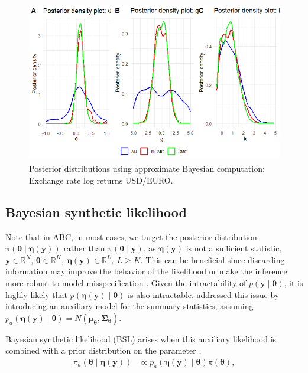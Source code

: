 \begin{figure}[!h]
	\includegraphics[width=340pt, height=200pt]{Chapters/chapter15/figures/ABCexcrate.png}
	\caption[List of figure caption goes here]{Posterior distributions using approximate Bayesian computation: Exchange rate log returns USD/EURO.}\label{figABCexc}
\end{figure}

\subsection{Bayesian synthetic likelihood}\label{sec15_13}

Note that in ABC, in most cases, we target the posterior distribution $\pi(\boldsymbol{\theta} \mid \boldsymbol{\eta}(\boldsymbol{y}))$ rather than $\pi(\boldsymbol{\theta} \mid \boldsymbol{y})$, as $\boldsymbol{\eta}(\boldsymbol{y})$ is not a sufficient statistic, $\boldsymbol{y}\in \mathbb{R}^N$, $\boldsymbol{\theta}\in \mathbb{R}^K, \ \boldsymbol{\eta}(\boldsymbol{y})\in \mathbb{R}^L, \ L\geq K$. This can be beneficial since discarding information may improve the behavior of the likelihood or make the inference more robust to model misspecification \cite{price2018bayesian}. Given the intractability of $p(\boldsymbol{y} \mid \boldsymbol{\theta})$, it is highly likely that $p(\boldsymbol{\eta}(\boldsymbol{y}) \mid \boldsymbol{\theta})$ is also intractable. \cite{wood2010statistical} addressed this issue by introducing an auxiliary model for the summary statistics, assuming $p_a(\boldsymbol{\eta}(\boldsymbol{y})\mid \boldsymbol{\theta}) = N(\boldsymbol{\mu}_{\boldsymbol{\theta}}, \boldsymbol{\Sigma}_{\boldsymbol{\theta}})$.

Bayesian synthetic likelihood (BSL) arises when this auxiliary likelihood is combined with a prior distribution on the parameter \cite{drovandi2015bayesian,price2018bayesian},
\begin{align*} 
	\pi_{a}(\boldsymbol{\theta} \mid \boldsymbol{\eta}(\boldsymbol{y})) &\propto p_{a}(\boldsymbol{\eta}(\boldsymbol{y})\mid \boldsymbol{\theta}) \pi(\boldsymbol{\theta}), 
\end{align*}

